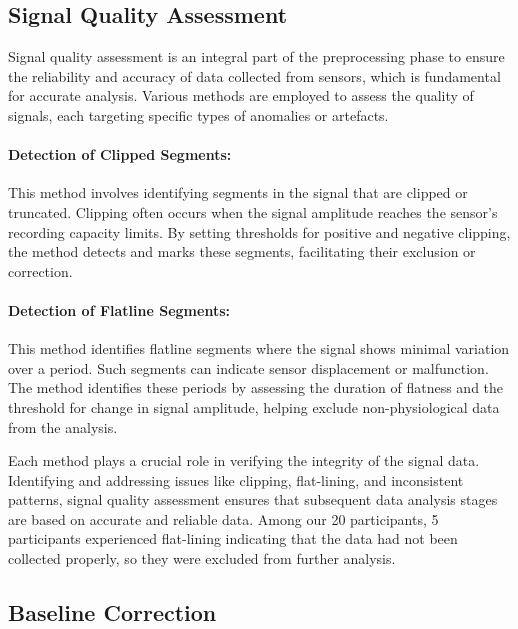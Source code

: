 \subsection*{Signal Quality Assessment }
\label{sec:signal_quality_assessment }

Signal quality assessment is an integral part of the preprocessing phase to ensure the reliability and accuracy of data collected from sensors, which is fundamental for accurate analysis. Various methods are employed to assess the quality of signals, each targeting specific types of anomalies or artefacts.


\paragraph{Detection of Clipped Segments:}
This method involves identifying segments in the signal that are clipped or truncated. Clipping often occurs when the signal amplitude reaches the sensor's recording capacity limits. By setting thresholds for positive and negative clipping, the method detects and marks these segments, facilitating their exclusion or correction.

\paragraph{Detection of Flatline Segments:}
This method identifies flatline segments where the signal shows minimal variation over a period. Such segments can indicate sensor displacement or malfunction. The method identifies these periods by assessing the duration of flatness and the threshold for change in signal amplitude, helping exclude non-physiological data from the analysis.


Each method plays a crucial role in verifying the integrity of the signal data. Identifying and addressing issues like clipping, flat-lining, and inconsistent patterns, signal quality assessment ensures that subsequent data analysis stages are based on accurate and reliable data. Among our 20 participants, 5 participants experienced  flat-lining indicating that the data had not been collected properly, so they were excluded from further analysis.



\subsection*{Baseline Correction}
\label{sec:baseline_correction}


